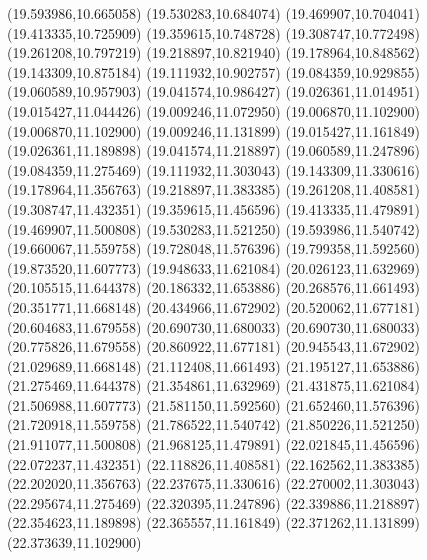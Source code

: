 {{\lineto(19.593986,10.665058)
\lineto(19.530283,10.684074)
\lineto(19.469907,10.704041)
\lineto(19.413335,10.725909)
\lineto(19.359615,10.748728)
\lineto(19.308747,10.772498)
\lineto(19.261208,10.797219)
\lineto(19.218897,10.821940)
\lineto(19.178964,10.848562)
\lineto(19.143309,10.875184)
\lineto(19.111932,10.902757)
\lineto(19.084359,10.929855)
\lineto(19.060589,10.957903)
\lineto(19.041574,10.986427)
\lineto(19.026361,11.014951)
\lineto(19.015427,11.044426)
\lineto(19.009246,11.072950)
\lineto(19.006870,11.102900)
\lineto(19.006870,11.102900)
\lineto(19.009246,11.131899)
\lineto(19.015427,11.161849)
\lineto(19.026361,11.189898)
\lineto(19.041574,11.218897)
\lineto(19.060589,11.247896)
\lineto(19.084359,11.275469)
\lineto(19.111932,11.303043)
\lineto(19.143309,11.330616)
\lineto(19.178964,11.356763)
\lineto(19.218897,11.383385)
\lineto(19.261208,11.408581)
\lineto(19.308747,11.432351)
\lineto(19.359615,11.456596)
\lineto(19.413335,11.479891)
\lineto(19.469907,11.500808)
\lineto(19.530283,11.521250)
\lineto(19.593986,11.540742)
\lineto(19.660067,11.559758)
\lineto(19.728048,11.576396)
\lineto(19.799358,11.592560)
\lineto(19.873520,11.607773)
\lineto(19.948633,11.621084)
\lineto(20.026123,11.632969)
\lineto(20.105515,11.644378)
\lineto(20.186332,11.653886)
\lineto(20.268576,11.661493)
\lineto(20.351771,11.668148)
\lineto(20.434966,11.672902)
\lineto(20.520062,11.677181)
\lineto(20.604683,11.679558)
\lineto(20.690730,11.680033)
\lineto(20.690730,11.680033)
\lineto(20.775826,11.679558)
\lineto(20.860922,11.677181)
\lineto(20.945543,11.672902)
\lineto(21.029689,11.668148)
\lineto(21.112408,11.661493)
\lineto(21.195127,11.653886)
\lineto(21.275469,11.644378)
\lineto(21.354861,11.632969)
\lineto(21.431875,11.621084)
\lineto(21.506988,11.607773)
\lineto(21.581150,11.592560)
\lineto(21.652460,11.576396)
\lineto(21.720918,11.559758)
\lineto(21.786522,11.540742)
\lineto(21.850226,11.521250)
\lineto(21.911077,11.500808)
\lineto(21.968125,11.479891)
\lineto(22.021845,11.456596)
\lineto(22.072237,11.432351)
\lineto(22.118826,11.408581)
\lineto(22.162562,11.383385)
\lineto(22.202020,11.356763)
\lineto(22.237675,11.330616)
\lineto(22.270002,11.303043)
\lineto(22.295674,11.275469)
\lineto(22.320395,11.247896)
\lineto(22.339886,11.218897)
\lineto(22.354623,11.189898)
\lineto(22.365557,11.161849)
\lineto(22.371262,11.131899)
\lineto(22.373639,11.102900)
\stroke}
%
}
